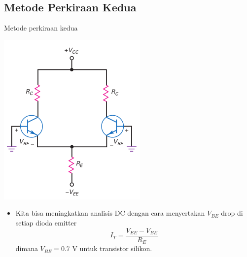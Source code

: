 \documentclass[aspectratio=169]{beamer}
\begin{document}
\subsection{Metode Perkiraan Kedua}
\begin{frame}{Metode perkiraan kedua}
	\begin{multicols}{2}
		\begin{center}
			\includegraphics[width=0.7\textheight]{gambar/01.diff-amp/01.second_approximation}
		\end{center}
		\columnbreak
		\begin{itemize}
			\item Kita bisa meningkatkan analisis DC dengan cara menyertakan $ V_{BE} $ drop di setiap dioda emitter
			\begin{equation} \label{pers.8}
				I_T = \frac{V_{EE} - V_{BE}}{R_E}
			\end{equation}
			dimana $ V_{BE} = 0.7 $ V untuk transistor silikon.
		\end{itemize}
		\vfill\null
	\end{multicols}
\end{frame}
\end{document}
